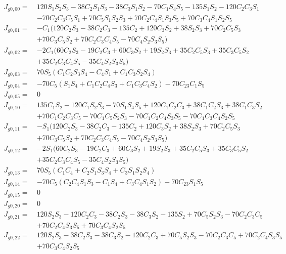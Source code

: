 \documentclass[12pt]{article}
\begin{document}
\begin{CJK}{UTF8}{bsmi}
\begin{equation*}
\begin{split}
J_{g0,00} =\  &120S_1S_2S_3 - 38C_2S_1S_3 - 38C_3S_1S_2 - 70C_1S_4S_5 - 135S_1S_2 - 120C_2C_3S_1\\
         	  &- 70C_2C_3C_5S_1 + 70C_5S_1S_2S_3  + 70C_2C_4S_1S_3S_5 + 70C_3C_4S_1S_2S_5\\
J_{g0,01} =\  &-C_1(120C_2S_3 - 38C_2C_3 - 135C_2 + 120C_3S_2 + 38S_2S_3 + 70C_2C_5S_3 \\
         	  &+ 70C_3C_5S_2 + 70C_2C_3C_4S_5 - 70C_4S_2S_3S_5)\\
J_{g0,02} =\  &-2C_1(60C_2S_3 - 19C_2C_3 + 60C_3S_2 + 19S_2S_3 + 35C_2C_5S_3 + 35C_3C_5S_2\\ 
         	  &+ 35C_2C_3C_4S_5 - 35C_4S_2S_3S_5)\\
J_{g0,03} =\  &70S_5(C_1C_2S_3S_4 - C_4S_1 + C_1C_3S_2S_4)\\
J_{g0,04} =\  &- 70C_5(S_1S_4 + C_1C_2C_4S_3 + C_1C_3C_4S_2) - 70C_{23}C_1S_5\\
J_{g0,05} =\  &0\\
J_{g0,10} =\  &135C_1S_2 - 120C_1S_2S_3 - 70S_1S_4S_5 + 120C_1C_2C_3 + 38C_1C_2S_3 + 38C_1C_3S_2 \\
		 	  &+ 70C_1C_2C_3C_5 - 70C_1C_5S_2S_3 - 70C_1C_2C_4S_3S_5 - 70C_1C_3C_4S_2S_5\\
J_{g0,11} =\  &-S_1(120C_2S_3 - 38C_2C_3 - 135C_2 + 120C_3S_2 + 38S_2S_3 + 70C_2C_5S_3\\
		   	  &+ 70C_3C_5S_2 + 70C_2C_3C_4S_5 - 70C_4S_2S_3S_5)\\
J_{g0,12} =\  &-2S_1(60C_2S_3 - 19C_2C_3 + 60C_3S_2 + 19S_2S_3 + 35C_2C_5S_3 + 35C_3C_5S_2 \\ 
		 	  &+ 35C_2C_3C_4S_5 - 35C_4S_2S_3S_5)\\
J_{g0,13} =\  &70S_5(C_1C_4 + C_2S_1S_3S_4 + C_3S_1S_2S_4)\\
J_{g0,14} =\  &- 70C_5(C_2C_4S_1S_3 - C_1S_4 + C_3C_4S_1S_2) - 70C_{23}S_1S_5\\
J_{g0,15} =\  &0\\
J_{g0,20} =\  &0\\
J_{g0,21} =\  &120S_2S_3 - 120C_2C_3 - 38C_2S_3 - 38C_3S_2 - 135S_2 + 70C_5S_2S_3 - 70C_2C_3C_5\\
		 	  &+ 70C_2C_4S_3S_5 + 70C_3C_4S_2S_5\\
J_{g0,22} =\  &120S_2S_3 - 38C_2S_3 - 38C_3S_2 - 120C_2C_3 + 70C_5S_2S_3 - 70C_2C_3C_5 + 70C_2C_4S_3S_5\\
		 	  &+ 70C_3C_4S_2S_5\\

\end{split}
\end{equation*}
\end{CJK}
\end{document}
